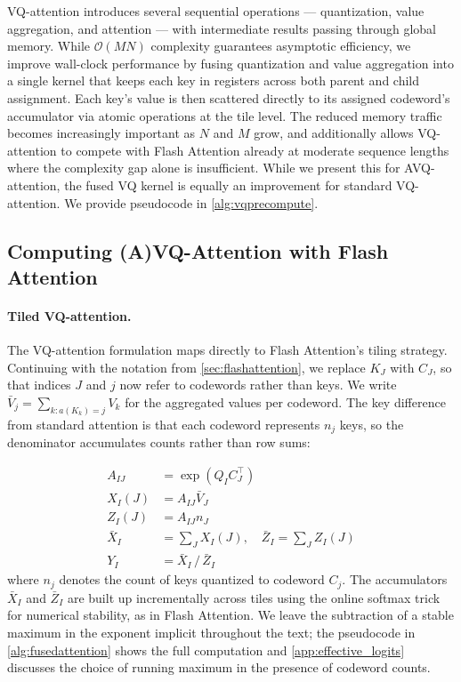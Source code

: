 VQ-attention introduces several sequential operations --- quantization, value aggregation, and attention --- with intermediate results passing through global memory. While $\mathcal{O}(MN)$ complexity guarantees asymptotic efficiency, we improve wall-clock performance by fusing quantization and value aggregation into a single kernel that keeps each key in registers across both parent and child assignment. Each key's value is then scattered directly to its assigned codeword's accumulator via atomic operations at the tile level. The reduced memory traffic becomes increasingly important as $N$ and $M$ grow, and additionally allows VQ-attention to compete with Flash Attention already at moderate sequence lengths where the complexity gap alone is insufficient. While we present this for AVQ-attention, the fused VQ kernel is equally an improvement for standard VQ-attention. We provide pseudocode in \cref{alg:vqprecompute}.
\subsection{Computing (A)VQ-Attention with Flash Attention}
\paragraph{Tiled VQ-attention.}
The VQ-attention formulation maps directly to Flash Attention's tiling strategy. Continuing with the notation from \cref{sec:flashattention}, we replace $K_J$ with $C_J$, so that indices $J$ and $j$ now refer to codewords rather than keys. We write $\bar{V}_j = \sum_{k: a(K_k)=j} V_k$ for the aggregated values per codeword. The key difference from standard attention is that each codeword represents $n_j$ keys, so the denominator accumulates counts rather than row sums:

\begin{equation}
\label{eq:vqflashattention}
\begin{aligned}
A_{IJ} &= \exp(Q_I C_J^{\top}) \\
X_I(J) &= A_{IJ} \bar{V}_J \\
Z_I(J) &= A_{IJ} n_J \\
\bar{X}_I &= \sum_J X_I(J), \quad \bar{Z}_I = \sum_J Z_I(J) \\
Y_I &= \bar{X}_I \,/\, \bar{Z}_I
\end{aligned}
\end{equation}
where $n_j$ denotes the count of keys quantized to codeword $C_j$. The accumulators $\bar{X}_I$ and $\bar{Z}_I$ are built up incrementally across tiles using the online softmax trick for numerical stability, as in Flash Attention. We leave the subtraction of a stable maximum in the exponent implicit throughout the text; the pseudocode in \cref{alg:fusedattention} shows the full computation and \cref{app:effective_logits} discusses the choice of running maximum in the presence of codeword counts.
